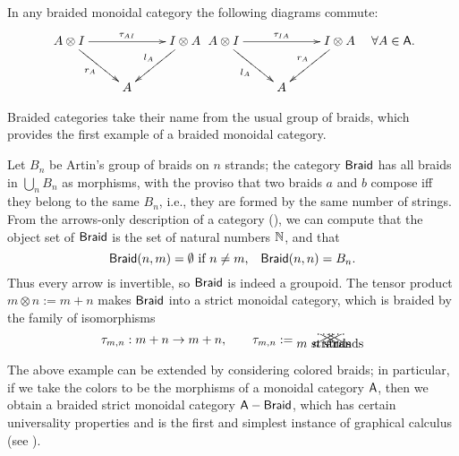 \begin{proposition}
  In any braided monoidal category the following diagrams commute: 
  \begin{eqnarray*}[c:c:c]
    \xymatrix{%
      A\otimes I
      &
      &
      I\otimes A
      \\
      &
      A
      &
      \ar "1,1";"1,3" ^{\tau_{AI}}
      \ar "1,1";"2,2" _{r_A}
      \ar "1,3";"2,2" _{l_A}
      }
    &
    \xymatrix{%
      A\otimes I
      &
      &
      I\otimes A
      \\
      &
      A
      &
      \ar "1,1";"1,3" ^{\tau_{IA}}
      \ar "1,1";"2,2" _{l_A}
      \ar "1,3";"2,2" _{r_A}
      }
    &
    \forall A \in \A.
  \end{eqnarray*}
\end{proposition}

Braided categories take their name from the usual group of braids,
which provides the first example of a braided monoidal category.
\begin{example}\label{xmp:braids}
  Let $B_n$ be Artin's group
  of braids on $n$ strands; the category $\mathsf{Braid}$ has all braids in
  $\bigcup_n B_n$ as morphisms, with the proviso that two braids  $a$ and
  $b$ compose iff they belong to the same $B_n$, i.e., they are formed
  by the same number of strings. From the arrows-only description of a
  category (), we can compute that the object
  set of $\mathsf{Braid}$ is the set of natural numbers $\mathbb{N}$, and that 
  \begin{equation*}
    \mathsf{Braid}(n,m) = \emptyset \text{ if $n\neq m$,} 
    \quad 
    \mathsf{Braid}(n,n) = B_n.
  \end{equation*}
  Thus every arrow is invertible, so $\mathsf{Braid}$ is indeed a
  groupoid. The tensor product $m\otimes n := m+n$ makes $\mathsf{Braid}$ into a
  strict monoidal category, which is braided by the family of
  isomorphisms
  \begin{equation*}
    \tau_{m,n}: m+n \to m+n, 
    \qquad
    \tau_{m,n} := {\xy*!C\xybox{%
      (0,0);(4,2)**\dir{-},
      (2,0);(6,2)**\dir{-},
      (1,0)*{\ldots},(5,2)*{\ldots},
      (1,-0.5)*\txt{$m$ strands},
      (4,0);(0,2)**\dir{-},
      (6,0);(2,2)**\dir{-},
      (5,0)*{\ldots}, (1,2)*{\ldots},
      (5,-0.5)*\txt{$n$ strands}
      }\endxy}
  \end{equation*}
\end{example}

The above example can be extended by considering colored braids; in
particular, if we take the colors to be the morphisms of a monoidal
category $\mathsf{A}$, then we obtain a braided strict monoidal category
$\mathsf{A}-\mathsf{Braid}$, which has certain universality properties and is the
first and simplest instance of graphical calculus (see
\cite{joyal-street;btc}).

